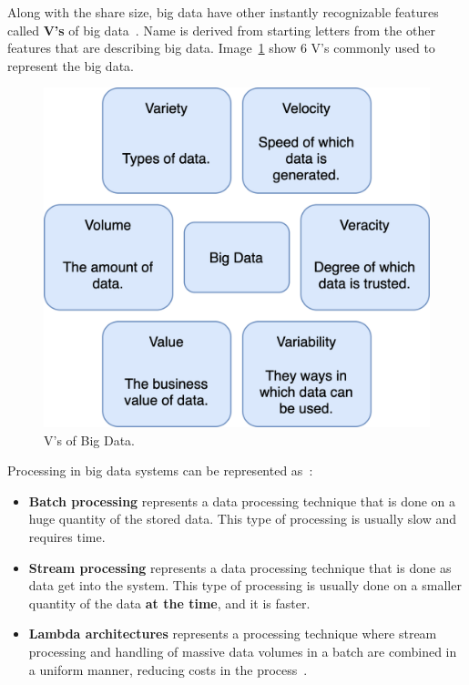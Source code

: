 Along with the share size, big data have other instantly recognizable features called \textbf{V's} of big data~\cite{PatgiriA16}. Name is derived from starting letters from the other features that are describing big data. Image~\ref{fig:fig3} show 6 V's commonly used to represent the big data.

\begin{figure}[H]
	\begin{center}
		\includegraphics[scale=0.7]{images/Figure3.png}
	\end{center}
	\vspace{-0.6cm}
	\caption{V's of Big Data.}
	\label{fig:fig3}
\end{figure}

Processing in big data systems can be represented as~\cite{phdthesis, KiranMMDB15}:

\begin{itemize}
	\item \textbf{Batch processing} represents a data processing technique that is done on a huge quantity of the stored data. This type of processing is usually slow and requires time.
	\item \textbf{Stream processing} represents a data processing technique that is done as data get into the system. This type of processing is usually done on a smaller quantity of the data \textbf{at the time}, and it is faster.
	\item \textbf{Lambda architectures} represents a processing technique where stream processing and handling of massive data volumes in a batch are combined in a uniform manner, reducing costs in the process~\cite{KiranMMDB15}.
\end{itemize}

